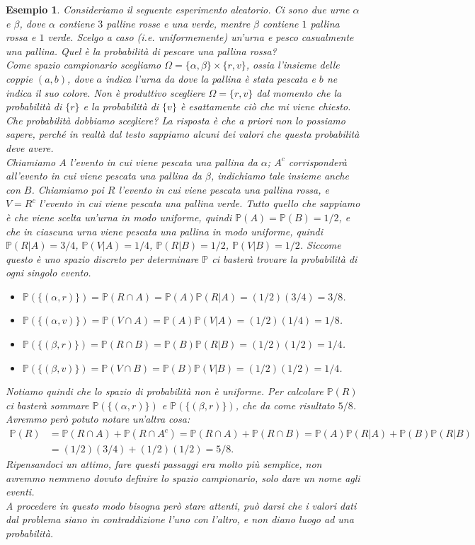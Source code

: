 \documentclass[11pt]{book}
\theoremstyle{Definizione}
\theoremstyle{TeoremaProposizioneLemmaCorollario}
\theoremstyle{OsservazioneNota}
\newtheorem{myes}{Esempio}[section]
\renewcommand{\P}{\mathbb{P}}
\begin{document}
\begin{myes}\label{es:EsempioUrne}
Consideriamo il seguente esperimento aleatorio. Ci sono due urne $\alpha$ e $\beta$, dove $\alpha$ contiene $3$ palline rosse e una verde, mentre $\beta$ contiene $1$ pallina rossa e $1$  verde. Scelgo a caso (i.e. uniformemente) un'urna e pesco casualmente una pallina. Quel è la probabilità di pescare una pallina rossa?\\
Come spazio campionario scegliamo $\Omega = \{\alpha,\beta\}\times \{r,v\}$, ossia l'insieme delle coppie $(a,b)$, dove $a$ indica l'urna da dove la pallina è stata pescata e $b$ ne indica il suo colore. Non è produttivo scegliere $\Omega = \{r,v\}$ dal momento che la probabilità di $\{r\}$ e la probabilità di $\{v\}$ è esattamente ciò che mi viene chiesto.\\
Che probabilità dobbiamo scegliere? La risposta è che a priori non lo possiamo sapere, perché in realtà dal testo sappiamo alcuni dei valori che questa probabilità deve avere.\\
Chiamiamo $A$ l'evento in cui viene pescata una pallina da $\alpha$; $A^c$ corrisponderà all'evento in cui viene pescata una pallina da $\beta$, indichiamo tale insieme anche con $B$. Chiamiamo poi $R$ l'evento in cui viene pescata una pallina rossa, e $V = R^c$ l'evento in cui viene pescata una pallina verde. Tutto quello che sappiamo è che viene scelta un'urna in modo uniforme, quindi $\P(A) = \P(B) = 1/2$, e che in ciascuna urna viene pescata una pallina in modo uniforme, quindi $\P(R|A) = 3/4$, $\P(V|A) = 1/4$, $\P(R|B) = 1/2$, $\P(V|B) = 1/2$. Siccome questo è uno spazio discreto per determinare $\P$ ci basterà trovare la probabilità di ogni singolo evento.
\begin{itemize}
\item $\P(\{(\alpha,r)\}) = \P(R \cap A) = \P(A)\P(R|A) =(1/2)(3/4) = 3/8$.
\item $\P(\{(\alpha,v)\}) = \P(V\cap A) = \P(A)\P(V|A) = (1/2)(1/4) = 1/8$.
\item $\P(\{(\beta,r)\}) = \P(R\cap B) = \P(B)\P(R|B) = (1/2)(1/2) = 1/4$.
\item $\P(\{(\beta,v)\}) = \P(V \cap B) = \P(B)\P(V|B) = (1/2)(1/2) = 1/4$.
\end{itemize}
Notiamo quindi che lo spazio di probabilità non è uniforme. Per calcolare $\P(R)$ ci basterà sommare $\P(\{(\alpha,r)\})$ e $\P(\{(\beta,r)\})$, che da come risultato $5/8$.\\
Avremmo però potuto notare un'altra cosa:
\begin{align*}
\P(R) &= \P(R\cap A) + \P(R\cap A^c) = \P(R\cap A)+\P(R\cap B) = \P(A)\P(R|A)+\P(B)\P(R|B)\\
&= (1/2)(3/4)+(1/2)(1/2) = 5/8.
\end{align*}
Ripensandoci un attimo, fare questi passaggi era molto più semplice, non avremmo nemmeno dovuto definire lo spazio campionario, solo dare un nome agli eventi.\\
A procedere in questo modo bisogna però stare attenti, può darsi che i valori dati dal problema siano in contraddizione l'uno con l'altro, e non diano luogo ad una probabilità.
\end{myes}
\end{document}
